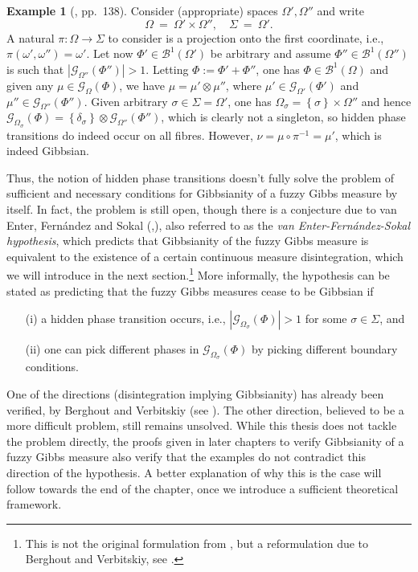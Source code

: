 \documentclass[12pt]{article}
\newcommand{\BB}{\mathscr{B}}
\newcommand{\G}{\mathcal{G}}
\newcommand{\set}[1]{\left\{#1\right\}}
\newcommand{\ra}{\rightarrow}
\newcommand{\1}{\mathbbm{1}}
\newcommand{\5}{\vspace{0.5cm}}
\theoremstyle{definition}
\newtheorem{ex}[thm]{Example}
\begin{document}
\begin{ex}[\cite{Ber}, pp.~138]
Consider (appropriate) spaces $\Omega',\Omega''$ and write
$$\Omega~=~\Omega'\times\Omega'',\quad\Sigma~=~\Omega'.$$
A natural $\pi:\Omega\ra\Sigma$ to consider is a projection onto the first coordinate, i.e., $\pi(\omega',\omega'')=\omega'$. Let now $\Phi'\in\BB^1(\Omega')$ be arbitrary and assume $\Phi''\in\BB^1(\Omega'')$ is such that $|\G_{\Omega''}(\Phi'')|>1$. Letting $\Phi:=\Phi'+\Phi''$, one has $\Phi\in\BB^1(\Omega)$ and given any $\mu\in\G_{\Omega}(\Phi)$, we have $\mu=\mu'\otimes\mu''$, where $\mu'\in\G_{\Omega'}(\Phi')$ and $\mu''\in\G_{\Omega''}(\Phi'')$. Given arbitrary $\sigma\in\Sigma=\Omega'$, one has $\Omega_\sigma=\set{\sigma}\times\Omega''$ and hence $\G_{\Omega_\sigma}(\Phi)=\set{\delta_\sigma}\otimes\G_{\Omega''}(\Phi'')$, which is clearly not a singleton, so hidden phase transitions do indeed occur on all fibres. However, $\nu=\mu\circ\pi^{-1}=\mu'$, which is indeed Gibbsian.
\end{ex}

Thus, the notion of hidden phase transitions doesn't fully solve the problem of sufficient and necessary conditions for Gibbsianity of a fuzzy Gibbs measure by itself. In fact, the problem is still open, though there is a conjecture due to van Enter, Fern\'andez and Sokal (\cite{EFS},\cite{Ber}), also referred to as the \textit{van Enter-Fern\'andez-Sokal hypothesis}, which predicts that Gibbsianity of the fuzzy Gibbs measure is equivalent to the existence of a certain continuous measure disintegration, which we will introduce in the next section.\footnote{This is not the original formulation from \cite{EFS}, but a reformulation due to Berghout and Verbitskiy, see \cite{Ber}.}  More informally, the hypothesis can be stated as predicting that the fuzzy Gibbs measures cease to be Gibbsian if 
\begin{itemize}
	\item[(i)] a hidden phase transition occurs, i.e., $|\G_{\Omega_\sigma}(\Phi)|>1$ for some $\sigma\in\Sigma$, and
	\item[(ii)]  one can pick different phases in $\G_{\Omega_\sigma}(\Phi)$ by picking different boundary conditions.
\end{itemize}
One of the directions (disintegration implying Gibbsianity) has already been verified, by Berghout and Verbitskiy (see \cite{Ber}). The other direction, believed to be a more difficult problem, still remains unsolved. While this thesis does not tackle the problem directly, the proofs given in later chapters to verify Gibbsianity of a fuzzy Gibbs measure also verify that the examples do not contradict this direction of the hypothesis. A better explanation of why this is the case will follow towards the end of the chapter, once we introduce a sufficient theoretical framework. \\
\end{document}
